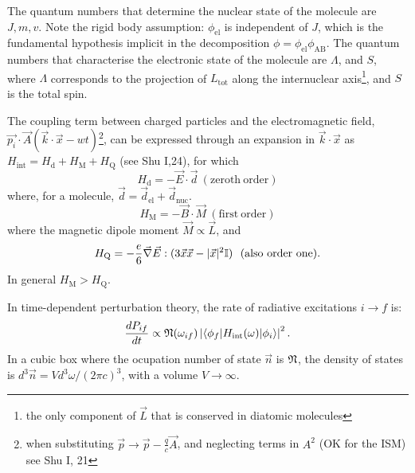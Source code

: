 The quantum numbers that determine the nuclear state of the molecule
are $J,m,v$. Note the rigid body assumption: $\phi_\mathrm{el}$ is
independent of $J$, which is the fundamental hypothesis implicit in
the decomposition $\phi = \phi_\mathrm{el} \phi_\mathrm{AB}$. The
quantum numbers that characterise the electronic state of the molecule
are $\Lambda$, and $S$, where $\Lambda$ corresponds to the projection
of $L_\mathrm{tot}$ along the internuclear axis\footnote{the only
component of $\vec{L}$ that is conserved in diatomic molecules}, and
$S$ is the total spin.








The coupling term between charged particles and the electromagnetic
field,
$\vec{p_i}\cdot\vec{A}(\vec{k}\cdot\vec{x}-wt)$\footnote{when
substituting 
$\vec{p} \rightarrow \vec{p}-\frac{q}{c}\vec{A}$, and neglecting terms
in  $A^2$ (OK for the ISM) see Shu I, 21}, can be expressed 
through an expansion in $\vec{k}\cdot\vec{x}$ as $H_\mathrm{int}
= H_\mathrm{d} + H_\mathrm{M} + H_\mathrm{Q}$ (see Shu I,24), for which
\[ H_\mathrm{d} = - \vec{E}\cdot\vec{d} ~ (\mathrm{zeroth~order})\]
where, for a molecule,  $\vec{d} = \vec{d}_\mathrm{el} + \vec{d}_\mathrm{nuc}$.
\[ H_\mathrm{M} = - \vec{B}\cdot\vec{M} ~  (\mathrm{first~order}) \]
where the magnetic dipole moment $\vec{M} \propto \vec{L} $, and
\[ H_\mathrm{Q} = - \frac{e}{6}\vec{\nabla}\vec{E}:(3 \vec{x}\vec{x} -
|\vec{x}|^2 {\Bbb I})  ~~  (\mathrm{also ~order~one}).  \]
In general  $H_\mathrm{M} >  H_\mathrm{Q}$. 




In time-dependent perturbation theory, the rate of radiative
excitations $i \rightarrow f$ is:
\[ \frac{dP_{if}}{dt} \propto    {\frak N}(\omega_{if})    \left| \langle \phi_f| H_\mathrm{int}(\omega) |\phi_i \rangle \right|^2. \] 
In a cubic box where the ocupation number of state 
$\vec{n}$ is ${\frak N}$, the density of states is $d^3\vec{n} = V
d^3\omega / (2\pi c )^3$, with a volume $V \rightarrow \infty $.

